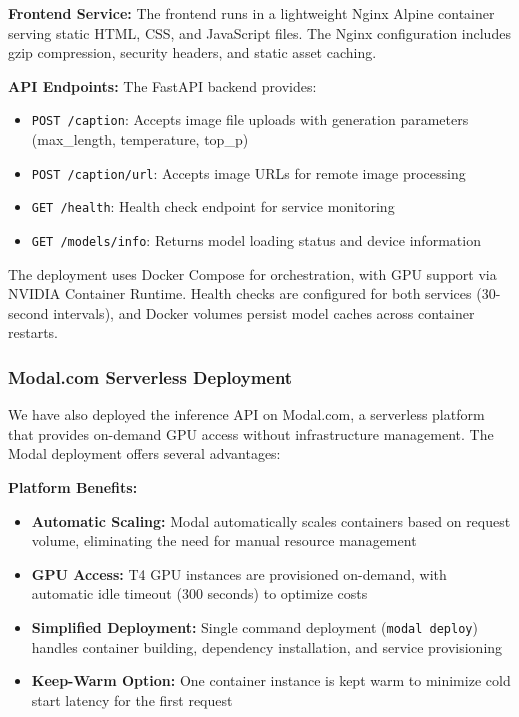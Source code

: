\documentclass[runningheads]{llncs}
\begin{document}
\textbf{Frontend Service:} The frontend runs in a lightweight Nginx Alpine container serving static HTML, CSS, and JavaScript files. The Nginx configuration includes gzip compression, security headers, and static asset caching.

\textbf{API Endpoints:} The FastAPI backend provides:
\begin{itemize}
\item \texttt{POST /caption}: Accepts image file uploads with generation parameters (max\_length, temperature, top\_p)
\item \texttt{POST /caption/url}: Accepts image URLs for remote image processing
\item \texttt{GET /health}: Health check endpoint for service monitoring
\item \texttt{GET /models/info}: Returns model loading status and device information
\end{itemize}

The deployment uses Docker Compose for orchestration, with GPU support via NVIDIA Container Runtime. Health checks are configured for both services (30-second intervals), and Docker volumes persist model caches across container restarts.

\subsubsection{Modal.com Serverless Deployment}

We have also deployed the inference API on Modal.com, a serverless platform that provides on-demand GPU access without infrastructure management. The Modal deployment offers several advantages:

\textbf{Platform Benefits:}
\begin{itemize}
\item \textbf{Automatic Scaling:} Modal automatically scales containers based on request volume, eliminating the need for manual resource management
\item \textbf{GPU Access:} T4 GPU instances are provisioned on-demand, with automatic idle timeout (300 seconds) to optimize costs
\item \textbf{Simplified Deployment:} Single command deployment (\texttt{modal deploy}) handles container building, dependency installation, and service provisioning
\item \textbf{Keep-Warm Option:} One container instance is kept warm to minimize cold start latency for the first request
\end{itemize}
\end{document}

